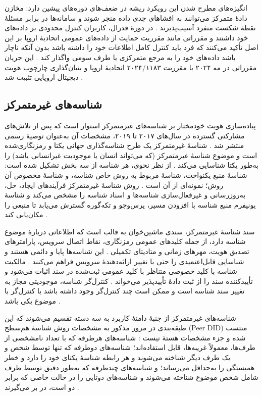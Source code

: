 \documentclass[12pt,a4paper]{article}
\begin{document}
انگیزه‌های مطرح شدن این رویکرد ریشه در ضعف‌های دوره‌های پیشین دارد: مخازن دادهٔ متمرکز می‌توانند به افشا‌های جدی داده منجر شوند و سامانه‌ها در برابر مسئلهٔ نقطهٔ شکست منفرد آسیب‌پذیرند \cite{mazzocca2025survey}. در دورهٔ فدرال، کاربران کنترل محدودی بر داده‌های خود داشتند و مقرراتی مانند مقرریت حمایت از داده‌های عمومی اتحادیهٔ اروپا بر این اصل تأکید می‌کنند که فرد باید کنترل کامل اطلاعات خود را داشته باشد بدون آنکه ناچار باشد داده‌های خود را به مرجع متمرکزی یا طرف سومی واگذار کند \cite{mazzocca2025survey}. این جریان مقرراتی در مه ۲۰۲۴ با مقرریت ۲۰۲۴/۱۱۸۳ اتحادیهٔ اروپا و بنیان‌گذاری چارچوب هویت دیجیتال اروپایی تثبیت شد \cite{mazzocca2025survey}.

\subsection{شناسه‌های غیرمتمرکز }

پیاده‌سازی هویت خودمختار بر شناسه‌های غیرمتمرکز  استوار است که پس از تلاش‌های مشارکتی گسترده در سال‌های ۲۰۱۷ تا ۲۰۱۹، مشخصات آن به‌عنوان توصیهٔ رسمی  منتشر شد \cite{mazzocca2025survey}. شناسهٔ غیرمتمرکز یک طرح شناسه‌گذاری جهانی یکتا و رمزنگاری‌شده است و موضوع شناسهٔ غیرمتمرکز (که می‌تواند انسان یا موجودیت غیرانسانی باشد) را به‌طور یکتا شناسایی می‌کند \cite{mazzocca2025survey}. از نظر نحوی، هر شناسه از سه بخش تشکیل شده است: شناسهٔ منبع یکنواخت، شناسهٔ مربوط به روش خاص شناسه، و شناسهٔ مخصوص آن روش؛ نمونه‌ای از آن  است \cite{mazzocca2025survey}. روش شناسهٔ غیرمتمرکز فرآیند‌های ایجاد، حل، به‌روزرسانی و غیرفعال‌سازی شناسه‌ها و اسناد شناسه را مشخص می‌کند و شناسهٔ یونیفرم منبع شناسه با افزودن مسیر، پرس‌وجو و تکه‌گوره گسترش می‌یابد تا منبعی را مکان‌یابی کند \cite{mazzocca2025survey}.

سند شناسهٔ غیرمتمرکز، سندی ماشین‌خوان به قالب  است که اطلاعاتی دربارهٔ موضوع شناسه دارد، از جمله کلید‌های عمومی رمزنگاری، نقاط اتصال سرویس، پارامتر‌های تصدیق هویت، مهر‌های زمانی و متادیتای تکمیلی \cite{mazzocca2025survey}. این شناسه‌ها پایا و دائمی هستند و شناسایی قابل‌اعتمیدی را حتی با تغییر ارائه‌دهندهٔ سرویس فراهم می‌کنند \cite{mazzocca2025survey}. مالکیت شناسه با کلید خصوصی متناظر با کلید عمومی ثبت‌شده در سند اثبات می‌شود و تأییدکننده سند را از ثبت دادهٔ تأییدپذیر می‌خواند \cite{mazzocca2025survey}. کنترل‌گر شناسه، موجودیتی مجاز به تغییر سند شناسه است و ممکن است چند کنترل‌گر وجود داشته باشد یا کنترل‌گر با موضوع یکی باشد \cite{mazzocca2025survey}.

شناسه‌های غیرمتمرکز از جنبهٔ دامنهٔ کاربرد به سه دسته تقسیم می‌شوند که این طبقه‌بندی در مرور مذکور به مشخصات روش شناسهٔ هم‌سطح (Peer DID) منتسب شده و جزء مشخصات هستهٔ  نیست \cite{mazzocca2025survey}: شناسه‌های هرطرفه  که با تعداد نامشخصی از طرف‌ها، معمولاً غریبه‌ها، قابل استفاده‌اند؛ شناسه‌های دوطرفه  که تنها توسط شخص و یک طرف دیگر شناخته می‌شوند و هر رابطه شناسهٔ یکتای خود را دارد و خطر همبستگی را به‌حداقل می‌رساند؛ و شناسه‌های چندطرفه  که به‌طور دقیق توسط  طرف شامل شخص موضوع شناخته می‌شوند و شناسه‌های دوتایی را در حالت خاصی که  برابر دو است، در بر می‌گیرند \cite{mazzocca2025survey}.
\end{document}
